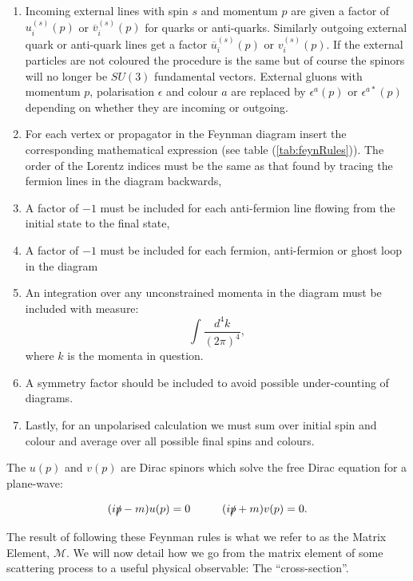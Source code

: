 	\begin{enumerate}
		\item Incoming external lines with spin $s$ and momentum $p$ are given a factor of $u^{(s)}_i(p)$ or $\overline{v}^{(s)}_i(p)$
		      for quarks or anti-quarks.  Similarly outgoing external quark or anti-quark lines get a factor
		      $\overline{u}^{(s)}_i(p)$ or $v^{(s)}_i(p)$.  If the external particles are not coloured the procedure is the same
		      but of course the spinors will no longer be $SU(3)$ fundamental vectors.  External gluons with momentum $p$, polarisation
		      $\epsilon$ and colour $a$ are replaced by $\epsilon^a(p)$ or $\epsilon^{a*}(p)$ depending on whether they are incoming or outgoing.
		\item For each vertex or propagator in the Feynman diagram insert the corresponding mathematical
		      expression (see table (\ref{tab:feynRules})).  The order of the Lorentz indices must be the same
		      as that found by tracing the fermion lines in the diagram backwards,
		\item A factor of $-1$ must be included for each anti-fermion line flowing from the initial state
		      to the final state,
		\item A factor of $-1$ must be included for each fermion, anti-fermion or ghost loop in the diagram
		\item An integration over any unconstrained momenta in the diagram must be included with measure:
		      \begin{equation}
		      	\int\frac{d^4k}{(2\pi)^4},
		      \end{equation}
		      where $k$ is the momenta in question.
		\item A symmetry factor should be included to avoid possible under-counting of diagrams.
		\item Lastly, for an unpolarised calculation we must sum over initial spin and colour and average
		      over all possible final spins and colours.
	\end{enumerate}

	The $u(p)$ and $v(p)$ are Dirac spinors which solve the free Dirac equation for a plane-wave:

	\begin{equation}
		(i\slashed p - m)u(p)=0\hspace{1cm}(i\slashed p + m)v(p)=0.
		\label{eqn:diracPW}
	\end{equation}

	The result of following these Feynman rules is what we refer to as the Matrix Element, $\mathcal{M}$.  We will now detail how
	we go from the matrix element of some scattering process to a useful physical observable: The ``cross-section''.

